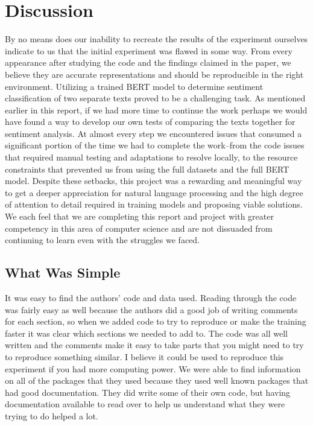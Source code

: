\documentclass[conference]{IEEEtran}
\begin{document}
\section{Discussion}
	By no means does our inability to recreate the results of the experiment ourselves indicate to us that the initial experiment was flawed in some way. From every appearance after studying the code and the findings claimed in the paper, we believe they are accurate representations and should be reproducible in the right environment.
	Utilizing a trained BERT model to determine sentiment classification of two separate texts proved to be a challenging task. As mentioned earlier in this report, if we had more time to continue the work perhaps we would have found a way to develop our own tests of comparing the texts together for sentiment analysis. At almost every step we encountered issues that consumed a significant portion of the time we had to complete the work–from the code issues that required manual testing and adaptations to resolve locally, to the resource constraints that prevented us from using the full datasets and the full BERT model.
	Despite these setbacks, this project was a rewarding and meaningful way to get a deeper appreciation for natural language processing and the high degree of attention to detail required in training models and proposing viable solutions. We each feel that we are completing this report and project with greater competency in this area of computer science and are not dissuaded from continuing to learn even with the struggles we faced.

\subsection{What Was Simple}
	It was easy to find the authors’ code and data used.  Reading through the code was fairly easy as well because the authors did a good job of writing comments for each section, so when we added code to try to reproduce or make the training faster it was clear which sections we needed to add to.
	The code was all well written and the comments make it easy to take parts that you might need to try to reproduce something similar.  I believe it could be used to reproduce this experiment if you had more computing power.  
	We were able to find information on all of the packages that they used because they used well known packages that had good documentation.  They did write some of their own code, but having documentation available to read over to help us understand what they were trying to do helped a lot.
\end{document}
